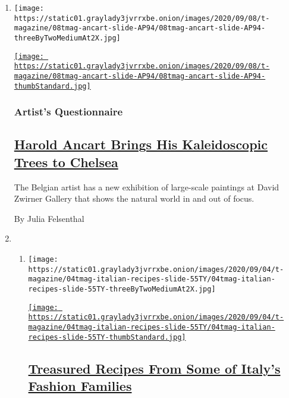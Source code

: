 \begin{enumerate}
\def\labelenumi{\arabic{enumi}.}
\item
  \texttt{[image: https://static01.graylady3jvrrxbe.onion/images/2020/09/08/t-magazine/08tmag-ancart-slide-AP94/08tmag-ancart-slide-AP94-threeByTwoMediumAt2X.jpg]}

  \href{/2020/09/08/t-magazine/harold-ancart.html}{\texttt{[image: https://static01.graylady3jvrrxbe.onion/images/2020/09/08/t-magazine/08tmag-ancart-slide-AP94/08tmag-ancart-slide-AP94-thumbStandard.jpg]}}

  \hypertarget{artists-questionnaire}{%
  \subsubsection{Artist's Questionnaire}\label{artists-questionnaire}}

  \hypertarget{harold-ancart-brings-his-kaleidoscopic-trees-to-chelsea}{%
  \subsection{\texorpdfstring{\href{/2020/09/08/t-magazine/harold-ancart.html}{Harold
  Ancart Brings His Kaleidoscopic Trees to
  Chelsea}}{Harold Ancart Brings His Kaleidoscopic Trees to Chelsea}}\label{harold-ancart-brings-his-kaleidoscopic-trees-to-chelsea}}

  The Belgian artist has a new exhibition of large-scale paintings at
  David Zwirner Gallery that shows the natural world in and out of
  focus.

  By Julia Felsenthal
\item
  \begin{enumerate}
  \def\labelenumii{\arabic{enumii}.}
  \item
    \texttt{[image: https://static01.graylady3jvrrxbe.onion/images/2020/09/04/t-magazine/04tmag-italian-recipes-slide-55TY/04tmag-italian-recipes-slide-55TY-threeByTwoMediumAt2X.jpg]}

    \href{/2020/09/04/t-magazine/fashion-italian-recipes.html}{\texttt{[image: https://static01.graylady3jvrrxbe.onion/images/2020/09/04/t-magazine/04tmag-italian-recipes-slide-55TY/04tmag-italian-recipes-slide-55TY-thumbStandard.jpg]}}

    \hypertarget{treasured-recipes-from-some-of-italys-fashion-families}{%
    \subsection{\texorpdfstring{\href{/2020/09/04/t-magazine/fashion-italian-recipes.html}{Treasured
    Recipes From Some of Italy's Fashion
    Families}}{Treasured Recipes From Some of Italy's Fashion Families}}\label{treasured-recipes-from-some-of-italys-fashion-families}}


\end{enumerate}
\end{enumerate}
